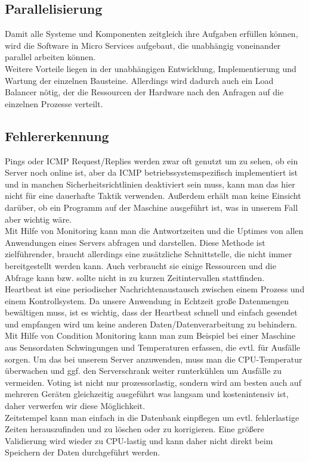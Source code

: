 \subsection{Parallelisierung}
Damit alle Systeme und Komponenten zeitgleich ihre Aufgaben erfüllen können, wird die Software in Micro Services aufgebaut, die unabhängig voneinander parallel arbeiten können.\\
Weitere Vorteile liegen in der unabhängigen Entwicklung, Implementierung und Wartung der einzelnen Bausteine. Allerdings wird dadurch auch ein Load Balancer nötig, der die Ressourcen der Hardware nach den Anfragen auf die einzelnen Prozesse verteilt. 
\subsection{Fehlererkennung}
Pings oder ICMP Request/Replies werden zwar oft genutzt um zu sehen, ob ein Server noch online ist, aber da ICMP betriebssystemspezifisch implementiert ist und in manchen Sicherheitsrichtlinien deaktiviert sein muss, kann man das hier nicht für eine dauerhafte Taktik verwenden. Außerdem erhält man keine Einsicht darüber, ob ein Programm auf der Maschine ausgeführt ist, was in unserem Fall aber wichtig wäre. 
\\
Mit Hilfe von Monitoring kann man die Antwortzeiten und die Uptimes von allen Anwendungen eines Servers abfragen und darstellen. Diese Methode ist zielführender, braucht allerdings eine zusätzliche Schnittstelle, die nicht immer bereitgestellt werden kann. Auch verbraucht sie einige Ressourcen und die Abfrage kann bzw. sollte nicht in zu kurzen Zeitintervallen stattfinden. 
\\
Heartbeat ist eine periodischer Nachrichtenaustausch zwischen einem Prozess und einem Kontrollsystem. Da unsere Anwendung in Echtzeit große Datenmengen bewältigen muss, ist es wichtig, dass der Heartbeat schnell und einfach gesendet und empfangen wird um keine anderen Daten/Datenverarbeitung zu behindern. 
Mit Hilfe von Condition Monitoring kann man zum Beispiel bei einer Maschine aus Sensordaten Schwingungen und Temperaturen erfassen, die evtl. für Ausfälle sorgen. Um das bei unserem Server anzuwenden, muss man die CPU-Temperatur überwachen und ggf. den Serverschrank weiter runterkühlen um Ausfälle zu vermeiden. 
Voting ist nicht nur prozessorlastig, sondern wird am besten auch auf mehreren Geräten gleichzeitig ausgeführt was langsam und kostenintensiv ist, daher verwerfen wir diese Möglichkeit.
\\
Zeitstempel kann man einfach in die Datenbank einpflegen um evtl. fehlerlastige Zeiten herauszufinden und zu löschen oder zu korrigieren. Eine größere Validierung wird wieder zu CPU-lastig und kann daher nicht direkt beim Speichern der Daten durchgeführt werden.
